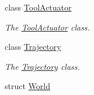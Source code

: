 \begin{DoxyCompactItemize}
class \hyperlink{classrobotis__manipulator_1_1_tool_actuator}{Tool\+Actuator}
\begin{DoxyCompactList}\small\item\em The \hyperlink{classrobotis__manipulator_1_1_tool_actuator}{Tool\+Actuator} class. \end{DoxyCompactList}\item 
class \hyperlink{classrobotis__manipulator_1_1_trajectory}{Trajectory}
\begin{DoxyCompactList}\small\item\em The \hyperlink{classrobotis__manipulator_1_1_trajectory}{Trajectory} class. \end{DoxyCompactList}\item 
struct \hyperlink{structrobotis__manipulator_1_1_world}{World}
\end{DoxyCompactItemize}
